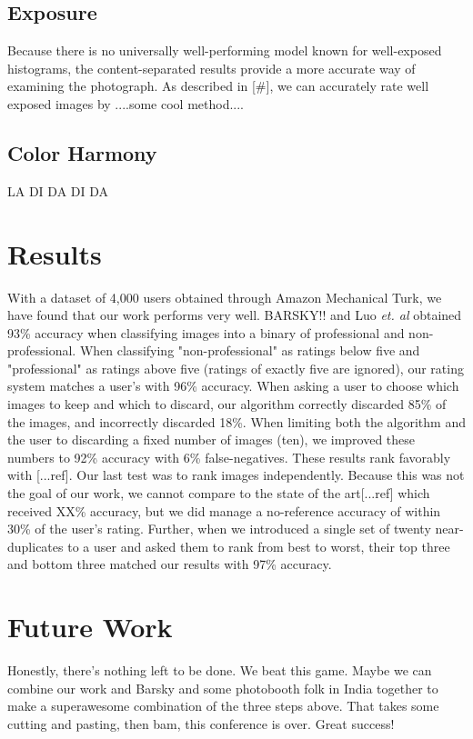 \documentclass[twocolumn]{article}
\begin{document}
\subsection{Exposure}
Because there is no universally well-performing  model known for well-exposed histograms, the content-separated results provide a more accurate way of examining the photograph. As described in [\#], we can accurately rate well exposed images by ....some cool method....

\subsection{Color Harmony}
LA DI DA DI DA

\section{Results}
With a dataset of 4,000 users obtained through Amazon Mechanical Turk, we have found that our work performs very well. BARSKY!!\cite{Yeh:2010:PPR:1873951.1873963} and Luo \emph{et. al}\cite{springerlink:10.1007/978-3-540-88690-7_29} obtained 93\% accuracy when classifying images into a binary of professional and non-professional. When classifying "non-professional" as ratings below five and "professional" as ratings above five (ratings of exactly five are ignored), our rating system matches a user's with 96\% accuracy.
When asking a user to choose which images to keep and which to discard, our algorithm correctly discarded 85\% of the images, and incorrectly discarded 18\%. When limiting both the algorithm and the user to discarding a fixed number of images (ten), we improved these numbers to 92\% accuracy with 6\% false-negatives. These results rank favorably with [...ref].
Our last test was to rank images independently. Because this was not the goal of our work, we cannot compare to the state of the art[...ref] which received XX\% accuracy, but we did manage a no-reference accuracy of within 30\% of the user's rating. Further, when we introduced a single set of twenty near-duplicates to a user and asked them to rank from best to worst, their top three and bottom three matched our results with 97\% accuracy.

\section{Future Work}
Honestly, there's nothing left to be done. We beat this game. Maybe we can combine our work and Barsky and some photobooth folk in India together to make a superawesome combination of the three steps above. That takes some cutting and pasting, then bam, this conference is over. Great success!



\end{document}
